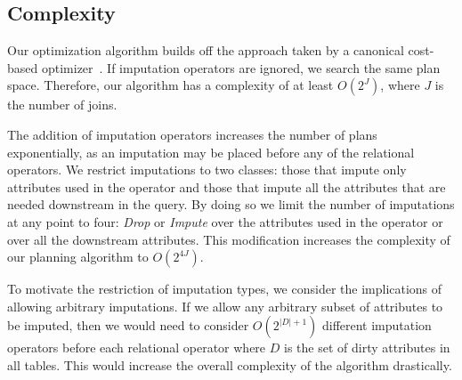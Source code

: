 %
%
%
%
%
%

\subsection{Complexity}\label{sec:complexity}
Our optimization algorithm builds off the approach taken by 
a canonical cost-based optimizer~\cite{blasgen1981system}.
If imputation operators are ignored, we search the same plan space.
Therefore, our algorithm has a complexity of at least $O(2^J)$, where $J$ is the number of joins.

The addition of imputation operators increases the number of plans exponentially, as an imputation may be placed before any of the relational operators.
We restrict imputations to two classes: those that impute only attributes used in the operator and those that impute all the attributes that are needed downstream in the query.
By doing so we limit the number of imputations at any point to four: \textit{Drop} or \textit{Impute} over the attributes used in the operator or over all the downstream attributes.
This modification increases the complexity of our planning algorithm to $O(2^{4J})$.

To motivate the restriction of imputation types, we consider the implications of allowing arbitrary imputations.
If we allow any arbitrary subset of attributes to be imputed, then we would need to consider $O(2^{|D|+1})$ different imputation operators before each relational operator where $D$ is the set of dirty attributes in all tables.
This would increase the overall complexity of the algorithm drastically.

